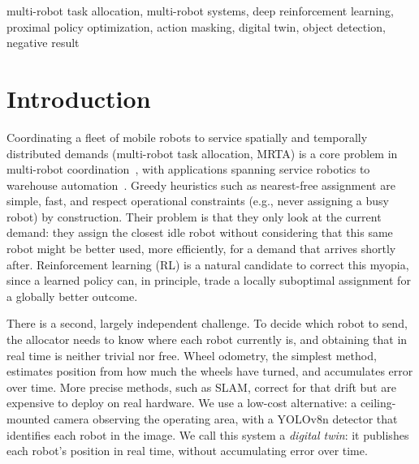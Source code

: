 \documentclass[conference]{IEEEtran}
\begin{document}
\begin{IEEEkeywords}
multi-robot task allocation, multi-robot systems, deep reinforcement learning, proximal policy optimization, action masking, digital twin, object detection, negative result
\end{IEEEkeywords}

\section{Introduction}

Coordinating a fleet of mobile robots to service spatially and temporally distributed demands (multi-robot task allocation, MRTA) is a core problem in multi-robot coordination~\cite{gerkey2004formal}, with applications spanning service robotics to warehouse automation~\cite{agrawal2022dcmrta,pal2025together}. Greedy heuristics such as nearest-free assignment are simple, fast, and respect operational constraints (e.g., never assigning a busy robot) by construction. Their problem is that they only look at the current demand: they assign the closest idle robot without considering that this same robot might be better used, more efficiently, for a demand that arrives shortly after. Reinforcement learning (RL) is a natural candidate to correct this myopia, since a learned policy can, in principle, trade a locally suboptimal assignment for a globally better outcome.

There is a second, largely independent challenge. To decide which robot to send, the allocator needs to know where each robot currently is, and obtaining that in real time is neither trivial nor free. Wheel odometry, the simplest method, estimates position from how much the wheels have turned, and accumulates error over time. More precise methods, such as SLAM, correct for that drift but are expensive to deploy on real hardware. We use a low-cost alternative: a ceiling-mounted camera observing the operating area, with a YOLOv8n detector that identifies each robot in the image. We call this system a \emph{digital twin}: it publishes each robot's position in real time, without accumulating error over time.
\end{document}

